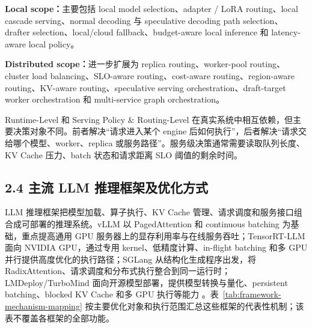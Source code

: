 \textbf{Local scope：}主要包括 local model selection、adapter / LoRA routing、local cascade serving、normal decoding 与 speculative decoding path selection、drafter selection、local/cloud fallback、budget-aware local inference 和 latency-aware local policy。

\textbf{Distributed scope：}进一步扩展为 replica routing、worker-pool routing、cluster load balancing、SLO-aware routing、cost-aware routing、region-aware routing、KV-aware routing、speculative serving orchestration、draft-target worker orchestration 和 multi-service graph orchestration。

Runtime-Level 和 Serving Policy \& Routing-Level 在真实系统中相互依赖，但主要决策对象不同。前者解决“请求进入某个 engine 后如何执行”，后者解决“请求交给哪个模型、worker、replica 或服务路径”。服务级决策通常需要读取队列长度、KV Cache 压力、batch 状态和请求距离 SLO 阈值的剩余时间。




\subsection*{2.4 主流 LLM 推理框架及优化方式}

LLM 推理框架把模型加载、算子执行、KV Cache 管理、请求调度和服务接口组合成可部署的推理系统。vLLM 以 PagedAttention 和 continuous batching 为基础，重点提高通用 GPU 服务器上的显存利用率与在线服务吞吐；TensorRT-LLM 面向 NVIDIA GPU，通过专用 kernel、低精度计算、in-flight batching 和多 GPU 并行提供高度优化的执行路径；SGLang 从结构化生成程序出发，将 RadixAttention、请求调度和分布式执行整合到同一运行时；LMDeploy/TurboMind 面向开源模型部署，提供模型转换与量化、persistent batching、blocked KV Cache 和多 GPU 执行等能力 \cite{kwon2023efficient,nvidia2026tensorrt,zheng2024sglang,lmdeploy2026documentation}。表~\ref{tab:framework-mechanism-mapping} 按主要优化对象和执行范围汇总这些框架的代表性机制；该表不覆盖各框架的全部功能。


